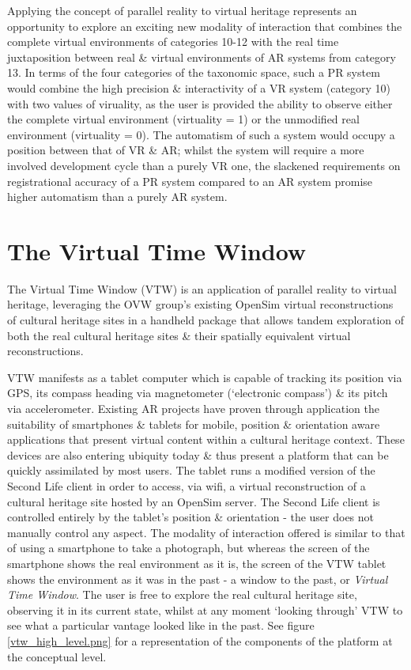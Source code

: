 Applying the concept of parallel reality to virtual heritage represents an opportunity to explore an exciting new modality of interaction that combines the complete virtual environments of categories 10-12 with the real time juxtaposition between real \& virtual environments of AR systems from category 13. In terms of the four categories of the taxonomic space, such a PR system would combine the high precision \& interactivity of a VR system (category 10) with two values of viruality, as the user is provided the ability to observe either the complete virtual environment (virtuality = 1) or the unmodified real environment (virtuality = 0). The automatism of such a system would occupy a position between that of VR \& AR; whilst the system will require a more involved development cycle than a purely VR one, the slackened requirements on registrational accuracy of a PR system compared to an AR system promise higher automatism than a purely AR system.


\section{The Virtual Time Window}
The Virtual Time Window (VTW) is an application of parallel reality to virtual heritage, leveraging the OVW group's existing OpenSim virtual reconstructions of cultural heritage sites in a handheld package that allows tandem exploration of both the real cultural heritage sites \& their spatially equivalent virtual reconstructions.

VTW manifests as a tablet computer which is capable of tracking its position via GPS, its compass heading via magnetometer (`electronic compass') \& its pitch via accelerometer. Existing AR projects have proven through application the suitability of smartphones \& tablets for mobile, position \& orientation aware applications that present virtual content within a cultural heritage context. These devices are also entering ubiquity today \& thus present a platform that can be quickly assimilated by most users. The tablet runs a modified version of the Second Life client in order to access, via wifi, a virtual reconstruction of a cultural heritage site hosted by an OpenSim server. The Second Life client is controlled entirely by the tablet's position \& orientation - the user does not manually control any aspect. The modality of interaction offered is similar to that of using a smartphone to take a photograph, but whereas the screen of the smartphone shows the real environment as it is, the screen of the VTW tablet shows the environment as it was in the past - a window to the past, or \textit{Virtual Time Window}. The user is free to explore the real cultural heritage site, observing it in its current state, whilst at any moment `looking through' VTW to see what a particular vantage looked like in the past. See figure \ref{vtw_high_level.png} for a representation of the components of the platform at the conceptual level.

